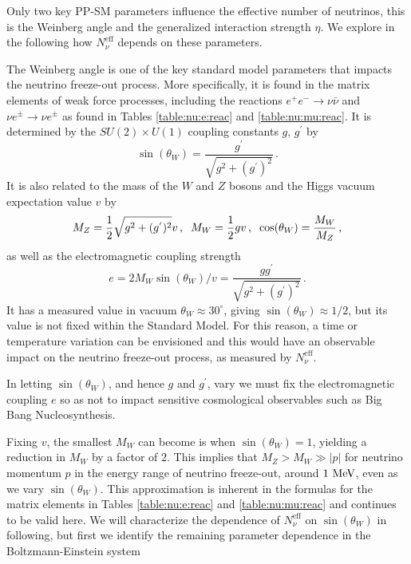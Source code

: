 
Only two key PP-SM parameters  influence the effective number of neutrinos, this is the Weinberg angle and the generalized interaction strength $\eta$. We explore in the following how  $N_\nu^{\mathrm{eff}}$ depends on these parameters.

The Weinberg angle is one of the key standard model parameters that impacts the neutrino freeze-out process.  More specifically, it is found in the matrix elements of weak force processes, including the reactions $e^+e^-\rightarrow \nu\bar\nu$ and $\nu e^\pm\rightarrow \nu e^\pm$ as found in Tables \ref{table:nu:e:reac} and \ref{table:nu:mu:reac}.  It is determined by the $SU(2)\times U(1)$ coupling constants $g$, $g^{'}$  by
\begin{equation}
\sin(\theta_W)=\frac{g^{'}}{\sqrt{g^2+(g^{'})^2}}\,.
\end{equation}
It is also related to the mass of the $W$ and $Z$ bosons and the Higgs vacuum expectation value $v$ by
\begin{equation}
M_Z=\frac{1}{2}\sqrt{g^2+(g^{'})^2}v\,,\hspace{2mm}  M_W=\frac{1}{2}gv\,,\hspace{2mm} \cos(\theta_W)=\frac{M_W}{M_Z}\,,
\end{equation}
as well as the electromagnetic coupling strength
\begin{equation}
e=2M_W\sin(\theta_W)/v=\frac{gg^{'}}{\sqrt{g^2+(g^{'})^2}}\,.
\end{equation}
It has a measured value in vacuum $\theta_W\approx 30^\circ$, giving $\sin(\theta_W)\approx 1/2$, but its value is not fixed within the Standard Model. For this reason, a time or temperature variation can be envisioned and this would have an observable impact on the neutrino freeze-out process, as measured by $N_\nu^{\mathrm{eff}}$.

In letting $\sin(\theta_W)$, and hence $g$ and $g^{'}$, vary we must fix the electromagnetic coupling $e$ so as not to impact sensitive cosmological observables such as Big Bang Nucleosynthesis.  

Fixing $v$, the smallest $M_W$ can become is when $\sin(\theta_W)=1$, yielding a reduction in $M_W$ by a factor of $2$.  This implies that $M_Z>M_W\gg |p|$ for neutrino momentum $p$ in the energy range of neutrino freeze-out, around $1\text{ MeV}$, even as we vary $\sin(\theta_W)$.  This approximation is inherent in the formulas for the matrix elements  in Tables  \ref{table:nu:e:reac} and \ref{table:nu:mu:reac} and continues to be valid here. We will characterize the dependence of $N_\nu^{\mathrm{eff}}$ on $\sin(\theta_W)$ in following, but first we identify the remaining parameter dependence in the Boltzmann-Einstein system

